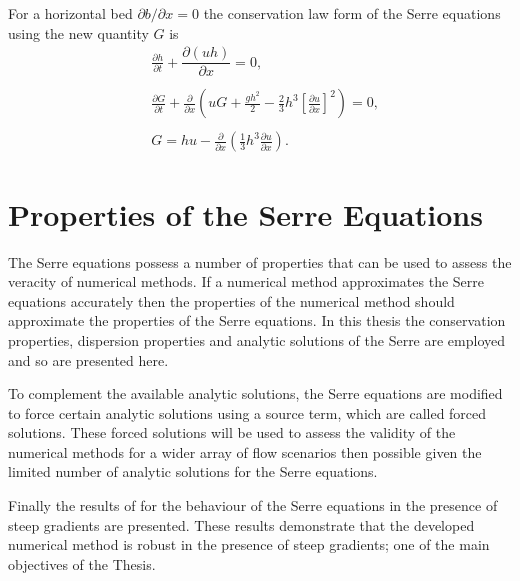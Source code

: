 For a horizontal bed $\partial b / \partial x = 0$ the conservation law form of the Serre equations using the new quantity $G$ is
\begin{subequations}
	\label{eqn:FullSerreConHorizBed}
	\begin{align}
	&\frac{\partial h}{\partial t} + \dfrac{\partial (uh)}{\partial x} = 0, \label{eqn:FullSerreConMassHorizBed} \\  \nonumber \\
	&\frac{\partial G}{\partial t}   + \frac{\partial}{\partial x} \left( {u} G + \frac{gh^2}{2} - \frac{2}{3}h^3 \left[\frac{\partial {u}}{\partial x}\right]^2 \right) = 0 , \label{eqn:SerreconsconmomHorizBed}\\ \nonumber \\
	&G =  h {u}  - \frac{\partial}{\partial x}\left(\frac{1}{3}h^3  \frac{\partial {u}}{\partial x}\right). \label{defn:SerreEqnConservedQuantity1HorizBed}
	\end{align}
\end{subequations}


\section{Properties of the Serre Equations}
The Serre equations possess a number of properties that can be used to assess the veracity of numerical methods. If a numerical method approximates the Serre equations accurately then the properties of the numerical method should approximate the properties of the Serre equations. In this thesis the conservation properties, dispersion properties and analytic solutions of the Serre are employed and so are presented here. 

To complement the available analytic solutions, the Serre equations are modified to force certain analytic solutions using a source term, which are called forced solutions. These forced solutions will be used to assess the validity of the numerical methods for a wider array of flow scenarios then possible given the limited number of analytic solutions for the Serre equations.

Finally the results of \citet{Pitt-2017-1725} for the behaviour of the Serre equations in the presence of steep gradients are presented. These results demonstrate that the developed numerical method is robust in the presence of steep gradients; one of the main objectives of the Thesis. 

